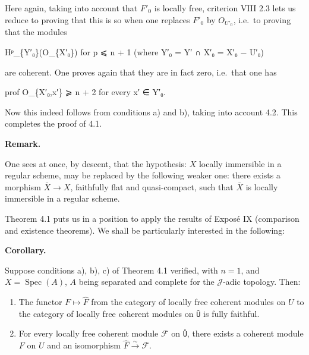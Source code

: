 \documentclass[
]{article}
\newenvironment{Shaded}{}{}
\newcommand{\NormalTok}[1]{#1}
\providecommand{\tightlist}{%
  \setlength{\itemsep}{0pt}\setlength{\parskip}{0pt}}
\begin{document}
Here again, taking into account that \(F'_{0}\) is locally free,
criterion VIII 2.3 lets us reduce to proving that this is so when one
replaces \(F'_{0}\) by \(O_{U'_{0}}\), i.e.~to proving that the modules

\begin{Shaded}
\begin{Highlighting}[]
\NormalTok{Hᵖ\_\{Y′₀\}(O\_\{X′₀\}) for p ⩽ n + 1  (where Y′₀ = Y′ ∩ X′₀ = X′₀ − U′₀)}
\end{Highlighting}
\end{Shaded}

are coherent. One proves again that they are in fact zero, i.e.~that one
has

\begin{Shaded}
\begin{Highlighting}[]
\NormalTok{prof O\_\{X′₀,x′\} ⩾ n + 2 for every x′ ∈ Y′₀.}
\end{Highlighting}
\end{Shaded}

Now this indeed follows from conditions a) and b), taking into account
4.2. This completes the proof of 4.1.

\textbf{Remark.}

One sees at once, by descent, that the hypothesis: \(X\) locally
immersible in a regular scheme, may be replaced by the following weaker
one: there exists a morphism \(\bar{X} \to X\), faithfully flat and
quasi-compact, such that \(\bar{X}\) is locally immersible in a regular
scheme.

Theorem 4.1 puts us in a position to apply the results of Exposé IX
(comparison and existence theorems). We shall be particularly interested
in the following:

\textbf{Corollary.}

Suppose conditions a), b), c) of Theorem 4.1 verified, with \(n = 1\),
and \(X = \operatorname{Spec}(A)\), \(A\) being separated and complete
for the \(\mathcal{J}\)-adic topology. Then:

\begin{enumerate}
\def\labelenumi{\arabic{enumi}.}
\tightlist
\item
  The functor \(F \mapsto \hat{F}\) from the category of locally free
  coherent modules on \(U\) to the category of locally free coherent
  modules on \texttt{Û} is fully faithful.
\item
  For every locally free coherent module \(\mathcal{F}\) on \texttt{Û},
  there exists a coherent module \(F\) on \(U\) and an isomorphism
  \(\hat{F} \xrightarrow{\sim} \mathcal{F}\).
\end{enumerate}
\end{document}
